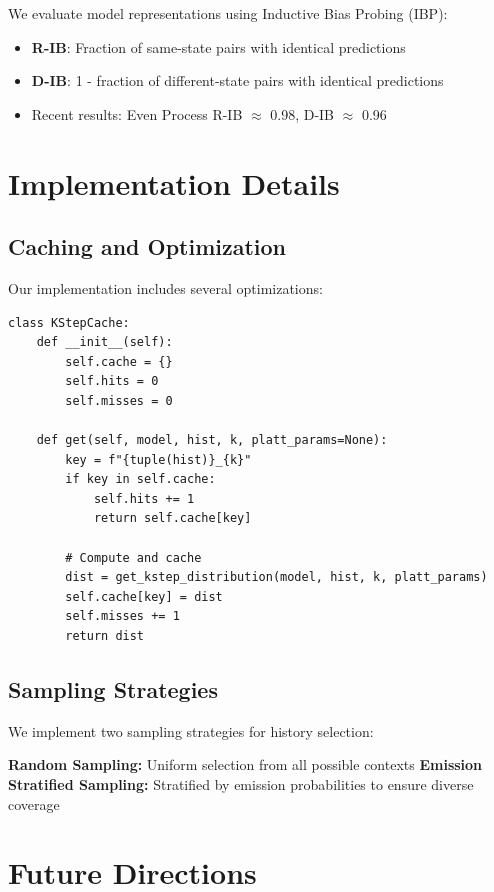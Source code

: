\documentclass[12pt]{article}
\begin{document}
We evaluate model representations using Inductive Bias Probing (IBP):
\begin{itemize}
    \item \textbf{R-IB}: Fraction of same-state pairs with identical predictions
    \item \textbf{D-IB}: 1 - fraction of different-state pairs with identical predictions
    \item Recent results: Even Process R-IB $\approx$ 0.98, D-IB $\approx$ 0.96
\end{itemize}

\section{Implementation Details}

\subsection{Caching and Optimization}

Our implementation includes several optimizations:

\begin{lstlisting}[caption=K-Step Distribution Caching]
class KStepCache:
    def __init__(self):
        self.cache = {}
        self.hits = 0
        self.misses = 0

    def get(self, model, hist, k, platt_params=None):
        key = f"{tuple(hist)}_{k}"
        if key in self.cache:
            self.hits += 1
            return self.cache[key]

        # Compute and cache
        dist = get_kstep_distribution(model, hist, k, platt_params)
        self.cache[key] = dist
        self.misses += 1
        return dist
\end{lstlisting}

\subsection{Sampling Strategies}

We implement two sampling strategies for history selection:

\textbf{Random Sampling:} Uniform selection from all possible contexts
\textbf{Emission Stratified Sampling:} Stratified by emission probabilities to ensure diverse coverage

\section{Future Directions}
\end{document}
